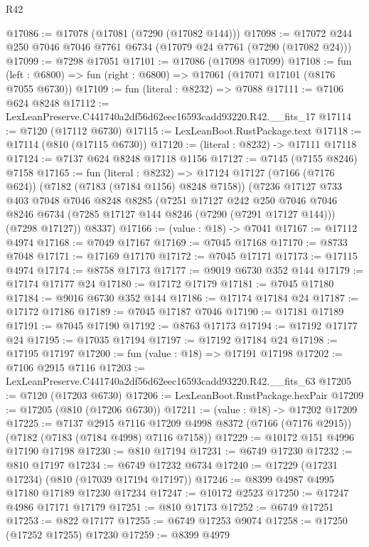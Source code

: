 \begin{lexlean}{R42}
\begin{coremodule}
{@17086 := @17078 (@17081 (@7290 (@17082 @144)))
@17098 := @17072 @244 @250 @7046 @7046 @7761 @6734 (@17079 @24 @7761 (@7290 (@17082 @24)))
@17099 := @7298 @17051
@17101 := @17086 (@17098 @17099)
@17108 := fun (left : @6800) => fun (right : @6800) => @17061 (@17071 @17101 (@8176 @7055 @6730))
@17109 := fun (literal : @8232) => @7088
@17111 := @7106 @624 @8248
@17112 := LexLeanPreserve.C441740a2df56d62eec16593cadd93220.R42.__fits_17
@17114 := @7120 (@17112 @6730)
@17115 := LexLeanBoot.RustPackage.text
@17118 := @17114 (@810 (@17115 @6730))
@17120 := (literal : @8232) -> @17111 @17118
@17124 := @7137 @624 @8248 @17118 @1156
@17127 := @7145 (@7155 @8246) @7158
@17165 := fun (literal : @8232) =>
  @17124
    @17127
    (@7166 (@7176 @624))
    (@7182 (@7183 (@7184 @1156) @8248 @7158))
    (@7236
      @17127
      @733
      @403
      @7048
      @7046
      @8248
      @8285
      (@7251
        @17127
        @242
        @250
        @7046
        @7046
        @8246
        @6734
        (@7285 @17127 @144 @8246 (@7290 (@7291 @17127 @144)))
        (@7298 @17127))
      @8337)
@17166 := (value : @18) -> @7041
@17167 := @17112 @4974
@17168 := @7049 @17167
@17169 := @7045 @17168
@17170 := @8733 @7048
@17171 := @17169 @17170
@17172 := @7045 @17171
@17173 := @17115 @4974
@17174 := @8758 @17173
@17177 := @9019 @6730 @352 @144
@17179 := @17174 @17177 @24
@17180 := @17172 @17179
@17181 := @7045 @17180
@17184 := @9016 @6730 @352 @144
@17186 := @17174 @17184 @24
@17187 := @17172 @17186
@17189 := @7045 @17187 @7046
@17190 := @17181 @17189
@17191 := @7045 @17190
@17192 := @8763 @17173
@17194 := @17192 @17177 @24
@17195 := @17035 @17194
@17197 := @17192 @17184 @24
@17198 := @17195 @17197
@17200 := fun (value : @18) => @17191 @17198
@17202 := @7106 @2915 @7116
@17203 := LexLeanPreserve.C441740a2df56d62eec16593cadd93220.R42.__fits_63
@17205 := @7120 (@17203 @6730)
@17206 := LexLeanBoot.RustPackage.hexPair
@17209 := @17205 (@810 (@17206 @6730))
@17211 := (value : @18) -> @17202 @17209
@17225 := @7137
    @2915
    @7116
    @17209
    @4998
    @8372
    (@7166 (@7176 @2915))
    (@7182 (@7183 (@7184 @4998) @7116 @7158))
@17229 := @10172 @151 @4996 @17190 @17198
@17230 := @810 @17194
@17231 := @6749 @17230
@17232 := @810 @17197
@17234 := @6749 @17232 @6734
@17240 := @17229 (@17231 @17234) (@810 (@17039 @17194 @17197))
@17246 := @8399 @4987 @4995 @17180 @17189 @17230 @17234
@17247 := @10172 @2523
@17250 := @17247 @4986 @17171 @17179
@17251 := @810 @17173
@17252 := @6749 @17251
@17253 := @822 @17177
@17255 := @6749 @17253 @9074
@17258 := @17250 (@17252 @17255) @17230
@17259 := @8399 @4979
}
\end{coremodule}
\end{lexlean}
